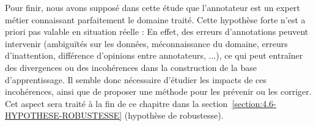 			Pour finir, nous avons supposé dans cette étude que l'annotateur est un expert métier connaissant parfaitement le domaine traité.
			Cette hypothèse forte n'est a priori pas valable en situation réelle : En effet, des erreurs d'annotations peuvent intervenir (ambiguïtés sur les données, méconnaissance du domaine, erreurs d'inattention, différence d'opinions entre annotateurs, ...), ce qui peut entraîner des divergences ou des incohérences dans la construction de la base d'apprentissage.
			Il semble donc nécessaire d'étudier les impacts de ces incohérences, ainsi que de proposer une méthode pour les prévenir ou les corriger.
			Cet aspect sera traité à la fin de ce chapitre dans la section~\ref{section:4.6-HYPOTHESE-ROBUSTESSE} (hypothèse de robustesse).